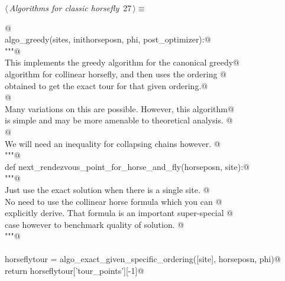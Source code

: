 \documentclass[11.5pt]{report}
\begin{document}
\begin{flushleft} \small\label{scrap31}\raggedright\small
{} $\langle\,${\itshape Algorithms for classic horsefly}\nobreak\ {\footnotesize {27}}$\,\rangle\equiv$
\vspace{-1ex}
\begin{list}{}{} \item
\mbox{}\verb@   @\\
\mbox{}\verb@def algo_greedy(sites, inithorseposn, phi, post_optimizer):@\\
\mbox{}\verb@      """@\\
\mbox{}\verb@      This implements the greedy algorithm for the canonical greedy@\\
\mbox{}\verb@      algorithm for collinear horsefly, and then uses the ordering @\\
\mbox{}\verb@      obtained to get the exact tour for that given ordering.@\\
\mbox{}\verb@      @\\
\mbox{}\verb@      Many variations on this are possible. However, this algorithm@\\
\mbox{}\verb@      is simple and may be more amenable to theoretical analysis. @\\
\mbox{}\verb@      @\\
\mbox{}\verb@      We will need an inequality for collapsing chains however. @\\
\mbox{}\verb@      """@\\
\mbox{}\verb@      def next_rendezvous_point_for_horse_and_fly(horseposn, site):@\\
\mbox{}\verb@            """@\\
\mbox{}\verb@            Just use the exact solution when there is a single site. @\\
\mbox{}\verb@            No need to use the collinear horse formula which you can @\\
\mbox{}\verb@            explicitly derive. That formula is  an important super-special @\\
\mbox{}\verb@            case however to benchmark quality of solution. @\\
\mbox{}\verb@            """@\\
\mbox{}\verb@@\\
\mbox{}\verb@            horseflytour = algo_exact_given_specific_ordering([site], horseposn, phi)@\\
\mbox{}\verb@            return horseflytour['tour_points'][-1]@\\

\end{list}
\end{flushleft}
\end{document}
